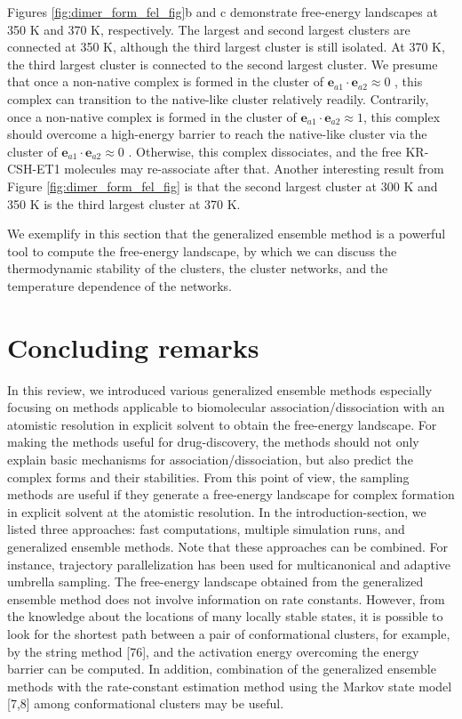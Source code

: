 Figures \ref{fig:dimer_form_fel_fig}b and c demonstrate free-energy landscapes at 350 K and 370 K, respectively. The largest and second largest clusters are connected at 350 K, although the third largest cluster is still isolated. At 370 K, the third largest cluster is connected to the second largest cluster. We presume that once a non-native complex is formed in the cluster of $\bm{e}_{a1} \cdot \bm{e}_{a2} \approx 0$ , this complex can transition to the native-like cluster relatively readily. Contrarily, once a non-native complex is formed in the cluster of $\bm{e}_{a1} \cdot \bm{e}_{a2} \approx 1$, this complex should overcome a high-energy barrier to reach the native-like cluster via the cluster of $\bm{e}_{a1} \cdot \bm{e}_{a2} \approx 0$ . Otherwise, this complex dissociates, and the free KR-CSH-ET1 molecules may re-associate after that. Another interesting result from Figure \ref{fig:dimer_form_fel_fig} is that the second largest cluster at 300 K and 350 K is the third largest cluster at 370 K.

We exemplify in this section that the generalized ensemble method is a powerful tool to compute the free-energy landscape, by which we can discuss the thermodynamic stability of the clusters, the cluster networks, and the temperature dependence of the networks.

\section{Concluding remarks}
In this review, we introduced various generalized ensemble methods especially focusing on methods applicable to biomolecular association/dissociation with an atomistic resolution in explicit solvent to obtain the free-energy landscape. For making the methods useful for drug-discovery, the methods should not only explain basic mechanisms for association/dissociation, but also predict the complex forms and their stabilities. From this point of view, the sampling methods are useful if they generate a free-energy landscape for complex formation in explicit solvent at the atomistic resolution. In the introduction-section, we listed three approaches: fast computations, multiple simulation runs, and generalized ensemble methods. Note that these approaches can be combined. For instance, trajectory parallelization has been used for multicanonical and adaptive umbrella sampling. The free-energy landscape obtained from the generalized ensemble method does not involve information on rate constants. However, from the knowledge about the locations of many locally stable states, it is possible to look for the shortest path between a pair of conformational clusters, for example, by the string method [76], and the activation energy overcoming the energy barrier can be computed. In addition, combination of the generalized ensemble methods with the rate-constant estimation method using the Markov state model [7,8] among conformational clusters may be useful. 

